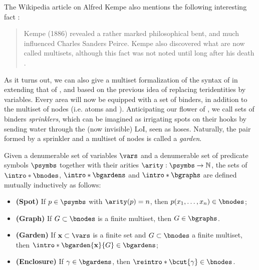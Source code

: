 \begin{scope}
\begin{scope}
The Wikipedia article on Alfred Kempe also mentions the following interesting
fact \cite{noauthor_alfred_2023}:
\begin{quote}
  Kempe (1886) revealed a rather marked philosophical bent, and much influenced
Charles Sanders Peirce. Kempe also discovered what are now called multisets,
although this fact was not noted until long after his death
.
\end{quote}
As it turns out, we can also give a multiset formalization of the syntax of
 in  extending that of , and based on the
previous idea of replacing teridentities by variables. Every area will now be
equipped with a set of binders, in addition to the multiset of nodes (i.e. atoms
and ). Anticipating our flower  of , we call
sets of binders \emph{sprinklers}, which can be imagined as irrigating spots on
their hooks by sending water through the (now invisible) LoI, seen as hoses.
Naturally, the pair formed by a sprinkler and a multiset of nodes is called a
\emph{garden}.

\begin{definition}[Graph] 
  
  Given a denumerable set of variables $\vars$ and a denumerable set of
  predicate symbols $\psymbs$ together with their arities $\arity : \psymbs \to
  \nats$, the sets of  $\intro*\bnodes$, 
  $\intro*\bgardens$ and  $\intro*\bgraphs$ are defined mutually
  inductively as follows:
  \begin{itemize}
    \item \textbf{(Spot)} If $p \in \psymbs$ with $\arity(p) = n$, then $p(x_1,
    \ldots, x_n) \in \bnodes$;
    \item \textbf{(Graph)} If $G \subset \bnodes$ is a finite multiset, then $G
    \in \bgraphs$.
    \item \textbf{(Garden)} If $\bx \subset \vars$ is a finite set and $G
    \subset \bnodes$ a finite multiset, then $\intro*\bgarden{\bx}{G} \in
    \bgardens$;
    \item \textbf{(Enclosure)} If $\gamma \in \bgardens$, then
    $\reintro*\bcut{\gamma} \in \bnodes$.
  \end{itemize}
\end{definition}


\end{scope}
\end{scope}
